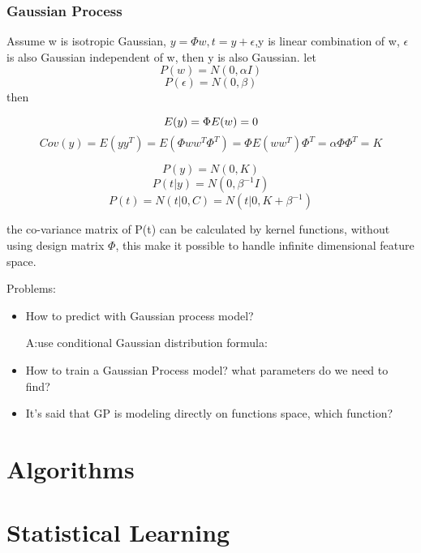 \documentclass[10pt,a4paper]{book}
\begin{document}
\subsection{Gaussian Process}

Assume w is isotropic Gaussian, $y=\Phi w, t = y + \epsilon$,y is linear combination of w, $\epsilon$ is also Gaussian independent of w, then y is also Gaussian.
 let
 $$P(w) = N(0, \alpha I)$$
 $$P(\epsilon) = N(0, \beta)$$
 then 

$$
    E(y) = \Phi E(w) = 0\\
$$
$$
  Cov(y) = E(y y^T) 
         = E(\Phi w w^T \Phi^T) 
         = \Phi E(w w^T) \Phi^T 
         = \alpha \Phi \Phi^T
         = K
$$

$$ P(y) = N(0, K) $$
$$ P(t|y) = N(0, \beta^{-1} I) $$
$$   P(t) = N(t|0, C) = N(t|0, K+ \beta ^{-1}) $$

the co-variance matrix of P(t) can be calculated by kernel functions, without using design matrix $\Phi$, this make it possible to handle infinite dimensional feature space.

Problems:
\begin{itemize}
	
	\item How to predict with Gaussian process model?

	A:use conditional Gaussian distribution formula:
 

	\item How to train a Gaussian Process model? what  parameters do we need to find?
	
	\item It's said that GP is modeling directly on functions space, which function?
\end{itemize}

\chapter{Algorithms}

\chapter{Statistical Learning}
\end{document}
